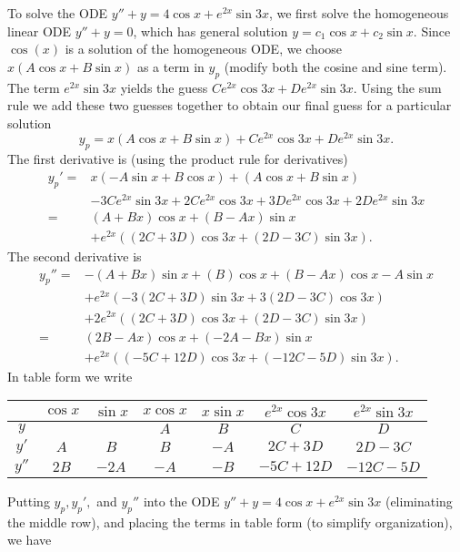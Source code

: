 \begin{example}
To solve the ODE $y''+y=4\cos x+e^{2x}\sin 3x$, we first solve the homogeneous linear ODE $y''+y=0$, which has general solution $y=c_1\cos x +c_2\sin x$. Since $\cos(x)$ is a solution of the homogeneous ODE, we choose $x(A\cos x+B\sin x)$ as a term in $y_p$ (modify both the cosine and sine term). The term $e^{2x}\sin 3x$ yields the guess 
$Ce^{2x}\cos 3x+ D e^{2x} \sin 3x$. Using the sum rule we add these two guesses together to obtain our final guess for a particular solution $$y_p= x(A\cos x+B\sin x) + Ce^{2x}\cos 3x+ D e^{2x} \sin 3x.$$  The first derivative is (using the product rule for derivatives) 
\begin{align*}
y_p'=& x(-A\sin x+B\cos x) +(A\cos x+B\sin x) \\
&-3Ce^{2x}\sin 3x+ 2Ce^{2x}\cos 3x+ 3 D e^{2x} \cos 3x + 2D e^{2x} \sin 3x\\ 
=& (A+Bx)\cos x +(B-Ax)\sin x \\
&+e^{2x}( (2C+3D)\cos 3x  + (2D-3C)\sin 3x ).
\end{align*}
The second derivative is 
\begin{align*}
y_p''=&-(A+Bx)\sin x +(B)\cos x +(B-Ax)\cos x-A\sin x \\
&+e^{2x}( -3(2C+3D)\sin 3x  + 3(2D-3C)\cos 3x )\\
&+2e^{2x}( (2C+3D)\cos 3x  + (2D-3C)\sin 3x )\\
=& (2B-Ax)\cos x +(-2A-Bx)\sin x \\
&+
 e^{2x} ( (-5C+12D) \cos 3x  + (-12C-5D)\sin  3x ).
\end{align*}
In table form we write
\begin{center}
\begin{tabular}{c|c|c|c|c|c|c|}
&$\cos x$ & $\sin x$ &$x\cos x$ & $x\sin x$ & $e^{2x}\cos 3x$ & $e^{2x}\sin 3x$\\\hline\hline
$y$& &  &$A$ & $B$ & $C$ & $D$\\
$y'$&$A$ & $B$ &$B$ & $-A$ & $2C+3D$ & $2D-3C$\\
$y''$&$2B$ & $-2A$ &$-A$ & $-B$ & $-5C+12D$ & $-12C-5D$\\
\end{tabular}
\end{center}
Putting $y_p,y_p',$ and $y_p''$ into the ODE $y''+y=4\cos x+e^{2x}\sin 3x$ (eliminating the middle row), and placing the terms in table form (to simplify organization), we have   
\begin{center}

\end{center}
\end{example}
